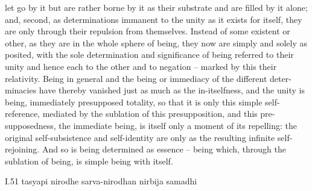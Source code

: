 let go by it but are rather borne by it as their substrate and are filled by
it alone; and, second, as determinations immanent to the unity as it exists
for itself, they are only through their repulsion from themselves. Instead of
some existent or other, as they are in the whole sphere of being, they now are
simply and solely as posited, with the sole determination and significance of
being referred to their unity and hence each to the other and to negation –
marked by this their relativity.
Being in general and the being or immediacy of the different deter-
minacies have thereby vanished just as much as the in-itselfness, and the
unity is being, immediately presupposed totality, so that it is only this simple
self-reference, mediated by the sublation of this presupposition, and this pre-
supposedness, the immediate being, is itself only a moment of its repelling:
the original self-subsistence and self-identity are only as the resulting infinite
self-rejoining. And so is being determined as essence – being which, through
the sublation of being, is simple being with itself.

I.51
tasyapi nirodhe sarva-nirodhan nirbija samadhi
